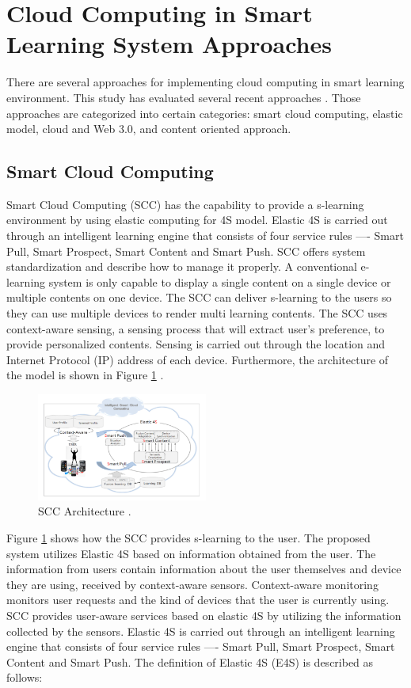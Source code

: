 \documentclass[journal]{vgtc}
\begin{document}
\section{Cloud Computing in Smart Learning System Approaches}
There are several approaches for implementing cloud computing in smart learning environment. This study has evaluated several recent approaches \cite{Kim2013,s110807835,jeong2013content,jeong2013cloud,nasr2012proposed}. Those approaches are categorized into certain categories: smart cloud computing, elastic model, cloud and Web 3.0, and content oriented approach.

  \subsection{Smart Cloud Computing}
  Smart Cloud Computing (SCC) has the capability to provide a s-learning environment by using elastic computing for 4S model. Elastic 4S is carried out through an intelligent learning engine that consists of four service rules —- Smart Pull, Smart Prospect, Smart Content and Smart Push. SCC offers system standardization and describe how to manage it properly. A conventional e-learning system is only capable to display a single content on a single device or multiple contents on one device. The SCC can deliver s-learning to the users so they can use multiple devices to render multi learning contents. The SCC uses context-aware sensing, a sensing process that will extract user's preference, to provide personalized contents. Sensing is carried out through the location and Internet Protocol (IP) address of each device. Furthermore, the architecture of the model is shown in Figure \ref{scc} \cite{s110807835}.

  \begin{figure}[t]
    \centering
    \includegraphics[width=0.5\textwidth]{scc}
    \caption{SCC Architecture \cite{s110807835}.}
    \label{scc}
  \end{figure}

  Figure \ref{scc} shows how the SCC provides s-learning to the user. The proposed system utilizes Elastic 4S based on information obtained from the user. The information from users contain information about the user themselves and device they are using, received by context-aware sensors. Context-aware monitoring monitors user requests and the kind of devices that the user is currently using. SCC provides user-aware services based on elastic 4S by utilizing the information collected by the sensors. Elastic 4S is carried out through an intelligent learning engine that consists of four service rules —- Smart Pull, Smart Prospect, Smart Content and Smart Push. The definition of Elastic 4S (E4S) is described as follows:
\end{document}

